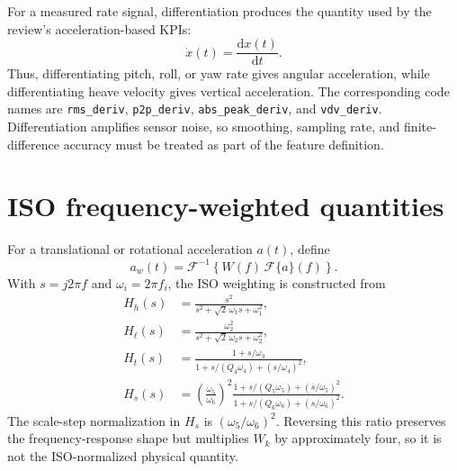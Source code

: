 \documentclass[letterpaper,journal]{IEEEtran}
\begin{document}
For a measured rate signal, differentiation produces the quantity used by the review's
acceleration-based KPIs:
\[
\dot{x}(t)=\frac{\mathrm{d}x(t)}{\mathrm{d}t}.
\]
Thus, differentiating pitch, roll, or yaw rate gives angular acceleration, while differentiating
heave velocity gives vertical acceleration. The corresponding code names are
\texttt{rms\_deriv}, \texttt{p2p\_deriv}, \texttt{abs\_peak\_deriv}, and
\texttt{vdv\_deriv}. Differentiation amplifies sensor noise, so smoothing, sampling rate, and
finite-difference accuracy must be treated as part of the feature definition.

\section{ISO frequency-weighted quantities}

For a translational or rotational acceleration $a(t)$, define
\[
a_w(t)=\mathcal{F}^{-1}\!\left\{W(f)\,\mathcal{F}\{a\}(f)\right\}.
\]
With $s=j2\pi f$ and $\omega_i=2\pi f_i$, the ISO weighting is constructed from
\begin{align*}
H_h(s) &= \frac{s^2}{s^2+\sqrt{2}\,\omega_1s+\omega_1^2},\\
H_\ell(s) &= \frac{\omega_2^2}{s^2+\sqrt{2}\,\omega_2s+\omega_2^2},\\
H_t(s) &= \frac{1+s/\omega_3}
{1+s/(Q_4\omega_4)+(s/\omega_4)^2},\\
H_s(s) &= \left(\frac{\omega_5}{\omega_6}\right)^2
\frac{1+s/(Q_5\omega_5)+(s/\omega_5)^2}
{1+s/(Q_6\omega_6)+(s/\omega_6)^2}.
\end{align*}
The scale-step normalization in $H_s$ is $({\omega_5}/{\omega_6})^2$. Reversing this
ratio preserves the frequency-response shape but multiplies $W_k$ by approximately four,
so it is not the ISO-normalized physical quantity.
\end{document}
